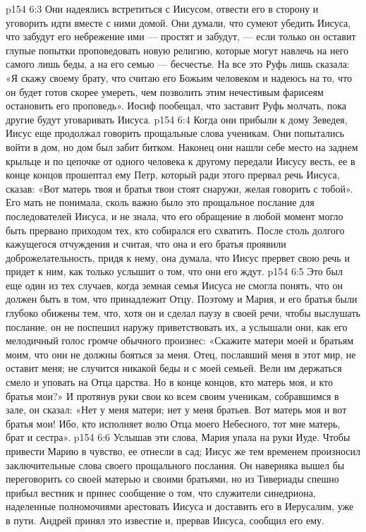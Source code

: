\vs p154 6:3 Они надеялись встретиться с Иисусом, отвести его в сторону и уговорить идти вместе с ними домой. Они думали, что сумеют убедить Иисуса, что забудут его небрежение ими --- простят и забудут, --- если только он оставит глупые попытки проповедовать новую религию, которые могут навлечь на него самого лишь беды, а на его семью --- бесчестье. На все это Руфь лишь сказала: «Я скажу своему брату, что считаю его Божьим человеком и надеюсь на то, что он будет готов скорее умереть, чем позволить этим нечестивым фарисеям остановить его проповедь». Иосиф пообещал, что заставит Руфь молчать, пока другие будут уговаривать Иисуса.
\vs p154 6:4 Когда они прибыли к дому Зеведея, Иисус еще продолжал говорить прощальные слова ученикам. Они попытались войти в дом, но дом был забит битком. Наконец они нашли себе место на заднем крыльце и по цепочке от одного человека к другому передали Иисусу весть, ее в конце концов прошептал ему Петр, который ради этого прервал речь Иисуса, сказав: «Вот матерь твоя и братья твои стоят снаружи, желая говорить с тобой». Его мать не понимала, сколь важно было это прощальное послание для последователей Иисуса, и не знала, что его обращение в любой момент могло быть прервано приходом тех, кто собирался его схватить. После столь долгого кажущегося отчуждения и считая, что она и его братья проявили доброжелательность, придя к нему, она думала, что Иисус прервет свою речь и придет к ним, как только услышит о том, что они его ждут.
\vs p154 6:5 Это был еще один из тех случаев, когда земная семья Иисуса не смогла понять, что он должен быть в том, что принадлежит Отцу. Поэтому и Мария, и его братья были глубоко обижены тем, что, хотя он и сделал паузу в своей речи, чтобы выслушать послание, он не поспешил наружу приветствовать их, а услышали они, как его мелодичный голос громче обычного произнес: «Скажите матери моей и братьям моим, что они не должны бояться за меня. Отец, пославший меня в этот мир, не оставит меня; не случится никакой беды и с моей семьей. Вели им держаться смело и уповать на Отца царства. Но в конце концов, кто матерь моя, и кто братья мои?» И протянув руки свои ко всем своим ученикам, собравшимся в зале, он сказал: «Нет у меня матери; нет у меня братьев. Вот матерь моя и вот братья мои! Ибо, кто исполняет волю Отца моего Небесного, тот мне матерь, брат и сестра».
\vs p154 6:6 Услышав эти слова, Мария упала на руки Иуде. Чтобы привести Марию в чувство, ее отнесли в сад; Иисус же тем временем произносил заключительные слова своего прощального послания. Он наверняка вышел бы переговорить со своей матерью и своими братьями, но из Тивериады спешно прибыл вестник и принес сообщение о том, что служители синедриона, наделенные полномочиями арестовать Иисуса и доставить его в Иерусалим, уже в пути. Андрей принял это известие и, прервав Иисуса, сообщил его ему.

